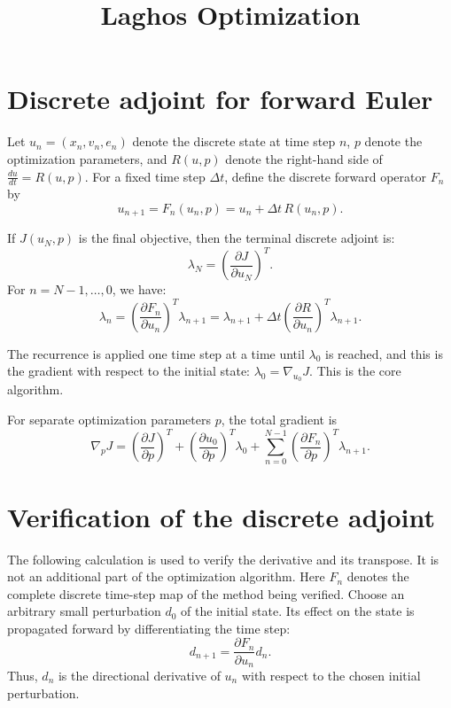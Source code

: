 \documentclass[11pt]{article}
\title{Laghos Optimization}
\author{}
\date{}
\begin{document}
\maketitle

\section{Discrete adjoint for forward Euler}

Let $u_n=(x_n,v_n,e_n)$ denote the discrete state at time step $n$,
$p$ denote the optimization parameters, and
$R(u,p)$ denote the right-hand side of $\frac{du}{dt}=R(u,p)$.
For a fixed time step $\Delta t$, define the discrete forward operator $F_n$ by
\begin{equation}
  u_{n+1}=F_n(u_n,p)=u_n+\Delta t\,R(u_n,p).
\end{equation}

\noindent
If $J(u_N,p)$ is the final objective, then the terminal discrete adjoint is:
\begin{equation}
  \lambda_N=\left(\frac{\partial J}{\partial u_N}\right)^T.
\end{equation}
For $n=N-1,\ldots,0$, we have:
\begin{equation}
\label{eq_back}
\boxed{\lambda_n =
\left(\frac{\partial F_n}{\partial u_n}\right)^T\lambda_{n+1}
=\lambda_{n+1}
+\Delta t
\left(\frac{\partial R}{\partial u_n}\right)^T\lambda_{n+1}.}
\end{equation}

\noindent
The recurrence is applied one time step at a time until $\lambda_0$ is
reached, and this is the gradient with respect to the initial state:
$\lambda_0=\nabla_{u_0}J$.
This is the core algorithm.

\noindent
For separate optimization parameters $p$, the total gradient is
\[
\boxed{
\nabla_p J =
\left(\frac{\partial J}{\partial p}\right)^T
+
\left(\frac{\partial u_0}{\partial p}\right)^T\lambda_0
+
\sum_{n=0}^{N-1}
\left(\frac{\partial F_n}{\partial p}\right)^T\lambda_{n+1}.
}
\]

\section{Verification of the discrete adjoint}
\label{sec_verify}

The following calculation is used to verify the derivative and its transpose.
It is not an additional part of the optimization algorithm.
Here $F_n$ denotes the complete discrete time-step map of the method being
verified.
Choose an arbitrary small perturbation $d_0$ of the initial state.
Its effect on the state is propagated forward by differentiating the time step:
\[
  d_{n+1} = \frac{\partial F_n}{\partial u_n}d_n.
\]
Thus, $d_n$ is the directional derivative of $u_n$ with respect to the chosen
initial perturbation.
\end{document}
